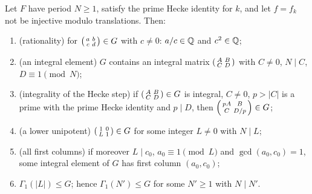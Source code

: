 \begin{theorem}[Level]\label{ch19:thm:level}
Let $F$ have period $N\ge1$, satisfy the prime Hecke identity for $k$, and let $f=f_k$ not be injective modulo translations.  Then:
\begin{enumerate}[label=(\alph*)]
\item (rationality) for $\left(\begin{smallmatrix}a&b\\c&d\end{smallmatrix}\right)\in G$ with $c\ne0$: $a/c\in{\mathbb{Q}}$ and $c^2\in{\mathbb{Q}}$;
\item (an integral element) $G$ contains an integral matrix $\left(\begin{smallmatrix}A&B\\C&D\end{smallmatrix}\right)$ with $C\ne0$, $N\mid C$, $D\equiv1\pmod N$;
\item (integrality of the Hecke step) if $\left(\begin{smallmatrix}A&B\\C&D\end{smallmatrix}\right)\in G$ is integral, $C\ne0$, $p>|C|$ is a prime with the prime Hecke identity and
  $p\mid D$, then $\left(\begin{smallmatrix}pA&B\\C&D/p\end{smallmatrix}\right)\in G$;
\item (a lower unipotent) $\left(\begin{smallmatrix}1&0\\L&1\end{smallmatrix}\right)\in G$ for some integer $L\ne0$ with $N\mid L$;
\item (all first columns) if moreover $L\mid c_0$, $a_0\equiv1\pmod L$ and $\gcd(a_0,c_0)=1$, some integral element of $G$ has first column
  $(a_0,c_0)$;
\item $\Gamma_1(|L|)\le G$; hence $\Gamma_1(N')\le G$ for some $N'\ge1$ with $N\mid N'$.
\end{enumerate}
\end{theorem}
